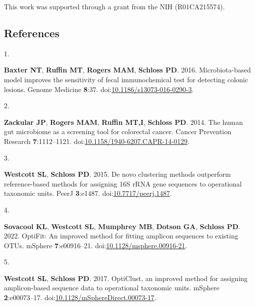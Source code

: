\documentclass[
]{article}
\newlength{\cslhangindent}
\newlength{\csllabelwidth}
\newlength{\cslentryspacingunit} %
\newenvironment{CSLReferences}[2] %
 {%
  \setlength{\parindent}{0pt}
  \ifodd #1
  \let\oldpar\par
  \def\par{\hangindent=\cslhangindent\oldpar}
  \fi
  \setlength{\parskip}{#2\cslentryspacingunit}
 }%
 {}
\newcommand{\CSLLeftMargin}[1]{\parbox[t]{\csllabelwidth}{#1}}
\newcommand{\CSLRightInline}[1]{\parbox[t]{\linewidth - \csllabelwidth}{#1}\break}
\begin{document}
This work was supported through a grant from the NIH (R01CA215574).

\newpage

\hypertarget{references}{%
\subsection{References}\label{references}}

\setlength{\parindent}{-0.25in}
\setlength{\leftskip}{0.25in}

\noindent

\hypertarget{refs}{}
\begin{CSLReferences}{0}{1}
\leavevmode{}%
\CSLLeftMargin{1. }
\CSLRightInline{\textbf{Baxter NT}, \textbf{Ruffin MT}, \textbf{Rogers
MAM}, \textbf{Schloss PD}. 2016. Microbiota-based model improves the
sensitivity of fecal immunochemical test for detecting colonic lesions.
Genome Medicine \textbf{8}:37.
doi:\href{https://doi.org/10.1186/s13073-016-0290-3}{10.1186/s13073-016-0290-3}.}

\leavevmode{}%
\CSLLeftMargin{2. }
\CSLRightInline{\textbf{Zackular JP}, \textbf{Rogers MAM},
\textbf{Ruffin MT,I}, \textbf{Schloss PD}. 2014. The human gut
microbiome as a screening tool for colorectal cancer. Cancer Prevention
Research \textbf{7}:1112--1121.
doi:\href{https://doi.org/10.1158/1940-6207.CAPR-14-0129}{10.1158/1940-6207.CAPR-14-0129}.}

\leavevmode{}%
\CSLLeftMargin{3. }
\CSLRightInline{\textbf{Westcott SL}, \textbf{Schloss PD}. 2015. De novo
clustering methods outperform reference-based methods for assigning 16S
rRNA gene sequences to operational taxonomic units. PeerJ
\textbf{3}:e1487.
doi:\href{https://doi.org/10.7717/peerj.1487}{10.7717/peerj.1487}.}

\leavevmode{}%
\CSLLeftMargin{4. }
\CSLRightInline{\textbf{Sovacool KL}, \textbf{Westcott SL},
\textbf{Mumphrey MB}, \textbf{Dotson GA}, \textbf{Schloss PD}. 2022.
OptiFit: An improved method for fitting amplicon sequences to existing
OTUs. mSphere \textbf{7}:e00916--21.
doi:\href{https://doi.org/10.1128/msphere.00916-21}{10.1128/msphere.00916-21}.}

\leavevmode{}%
\CSLLeftMargin{5. }
\CSLRightInline{\textbf{Westcott SL}, \textbf{Schloss PD}. 2017.
OptiClust, an improved method for assigning amplicon-based sequence data
to operational taxonomic units. mSphere \textbf{2}:e00073--17.
doi:\href{https://doi.org/10.1128/mSphereDirect.00073-17}{10.1128/mSphereDirect.00073-17}.}


\end{CSLReferences}
\end{document}
